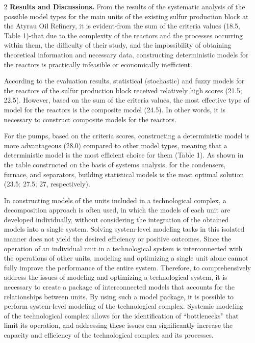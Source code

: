 \begin{multicols}{2}
{\bfseries Results and Discussions.} From the results of the systematic
analysis of the possible model types for the main units of the existing
sulfur production block at the Atyrau Oil Refinery, it is evident-from
the sum of the criteria values (18.5, Table 1)-that due to the
complexity of the reactors and the processes occurring within them, the
difficulty of their study, and the impossibility of obtaining
theoretical information and necessary data, constructing deterministic
models for the reactors is practically infeasible or economically
inefficient.

According to the evaluation results, statistical (stochastic) and fuzzy
models for the reactors of the sulfur production block received
relatively high scores (21.5; 22.5). However, based on the sum of the
criteria values, the most effective type of model for the reactors is
the composite model (24.5). In other words, it is necessary to construct
composite models for the reactors.

For the pumps, based on the criteria scores, constructing a
deterministic model is more advantageous (28.0) compared to other model
types, meaning that a deterministic model is the most efficient choice
for them (Table 1). As shown in the table constructed on the basis of
systems analysis, for the condensers, furnace, and separators, building
statistical models is the most optimal solution (23.5; 27.5; 27,
respectively).

In constructing models of the units included in a technological complex,
a decomposition approach is often used, in which the models of each unit
are developed individually, without considering the integration of the
obtained models into a single system. Solving system-level modeling
tasks in this isolated manner does not yield the desired efficiency or
positive outcomes. Since the operation of an individual unit in a
technological system is interconnected with the operations of other
units, modeling and optimizing a single unit alone cannot fully improve
the performance of the entire system. Therefore, to comprehensively
address the issues of modeling and optimizing a technological system, it
is necessary to create a package of interconnected models that accounts
for the relationships between units. By using such a model package, it
is possible to perform system-level modeling of the technological
complex. Systemic modeling of the technological complex allows for the
identification of ``bottlenecks'' that limit its operation, and
addressing these issues can significantly increase the capacity and
efficiency of the technological complex and its processes.


\end{multicols}
